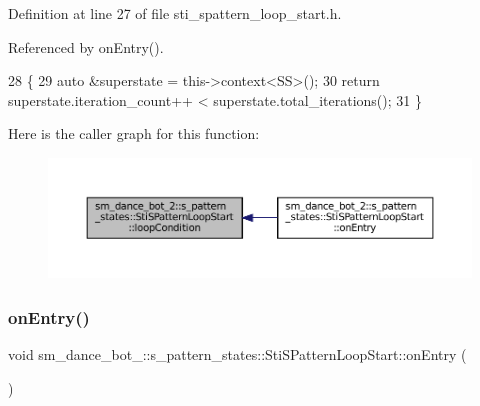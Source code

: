 Definition at line 27 of file sti\+\_\+spattern\+\_\+loop\+\_\+start.\+h.



Referenced by on\+Entry().


\begin{DoxyCode}
28   \{
29     \textcolor{keyword}{auto} &superstate = this->context<SS>();
30     \textcolor{keywordflow}{return} superstate.iteration\_count++ < superstate.total\_iterations();
31   \}
\end{DoxyCode}
Here is the caller graph for this function\+:
\nopagebreak
\begin{figure}[H]
\begin{center}
\leavevmode
\includegraphics[width=350pt]{structsm__dance__bot__2_1_1s__pattern__states_1_1StiSPatternLoopStart_afc9d41599d4ac143e063d19d647480dd_icgraph}
\end{center}
\end{figure}
\mbox{\label{structsm__dance__bot__2_1_1s__pattern__states_1_1StiSPatternLoopStart_aa42d37cd2af3150d8a5c140932eeb9ea}} 
\subsubsection{\texorpdfstring{on\+Entry()}{onEntry()}}
{\footnotesize\ttfamily void sm\+\_\+dance\+\_\+bot\+\_\+::s\+\_\+pattern\+\_\+states\+::\+Sti\+S\+Pattern\+Loop\+Start\+::on\+Entry (\begin{DoxyParamCaption}{ }\end{DoxyParamCaption})\hspace{0.3cm}{\ttfamily [inline]}}



